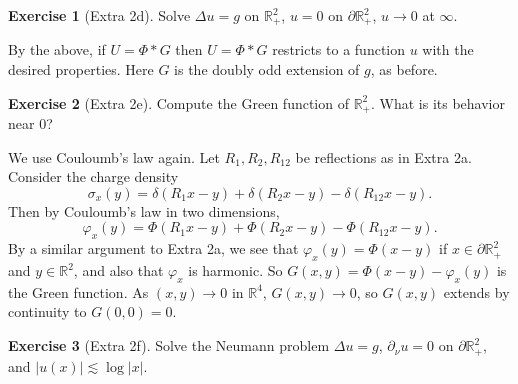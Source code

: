 \documentclass[10pt]{article}
\newcommand{\RR}{\mathbb{R}}
\theoremstyle{definition}
\newtheorem{exer}{Exercise}
\begin{document}
\begin{exer}[Extra 2d]
Solve $\Delta u = g$ on $\RR^2_+$, $u = 0$ on $\partial \RR^2_+$, $u \to 0$ at $\infty$.
\end{exer}

By the above, if $U = \Phi * G$ then $U = \Phi * G$ restricts to a function $u$ with the desired properties.
Here $G$ is the doubly odd extension of $g$, as before.

\begin{exer}[Extra 2e]
Compute the Green function of $\RR^2_+$. What is its behavior near $0$?
\end{exer}

We use Couloumb's law again.
Let $R_1,R_2,R_{12}$ be reflections as in Extra 2a.
Consider the charge density
$$\sigma_x(y) = \delta(R_1 x - y) + \delta(R_2 x - y) - \delta(R_{12} x - y).$$
Then by Couloumb's law in two dimensions,
$$\varphi_x(y) = \Phi(R_1 x - y) + \Phi(R_2 x - y) - \Phi(R_{12} x - y).$$
By a similar argument to Extra 2a, we see that $\varphi_x(y) = \Phi(x - y)$ if $x \in \partial \RR^2_+$ and $y \in \RR^2$, and also that $\varphi_x$ is harmonic.
So $G(x, y) = \Phi(x - y) - \varphi_x(y)$ is the Green function.
As $(x, y) \to 0$ in $\RR^4$, $G(x, y) \to 0$, so $G(x, y)$ extends by continuity to $G(0, 0) = 0$.

\begin{exer}[Extra 2f]
Solve the Neumann problem $\Delta u = g$, $\partial_\nu u = 0$ on $\partial \RR^2_+$, and $|u(x)| \lesssim \log|x|$.
\end{exer}
\end{document}
